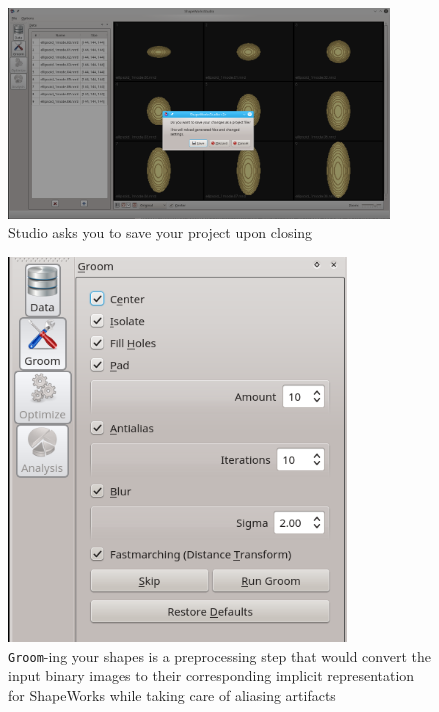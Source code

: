 \documentclass[letterpaper,12pt]{article}   %
\begin{document}
\begin{figure}[!htp]
\centering
\includegraphics[width=0.9\textwidth]{figs_v2/close.png}
\caption{Studio asks you to save your project upon closing}
\label{fig:close}
\end{figure}

\vspace{0.05in}
\begin{figure}[!htp]
	\begin{minipage}[c]{0.6\textwidth}
		\centering
		\includegraphics[width=0.8\textwidth]{figs_v2/groom.png}
	\end{minipage}\hfill
	\begin{minipage}[c]{0.3\textwidth}
		\centering
		\caption{\texttt{Groom}-ing your shapes is a preprocessing step that would convert the input binary images to their corresponding implicit representation for ShapeWorks while taking care of aliasing artifacts} 
		\label{fig:groom}
	\end{minipage}
\end{figure}
\end{document}
